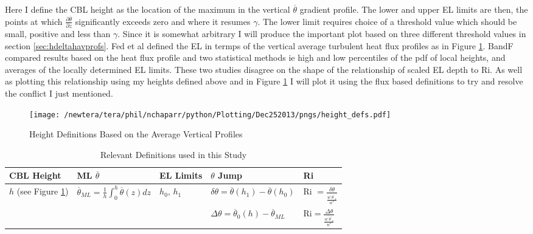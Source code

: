 Here I define the \acs{CBL} height as the location of the maximum in the vertical $\overline{\theta}$ gradient profile.  The lower and upper \acs{EL} limits are then, the points at which $\frac{\partial \overline{\theta}}{\partial z}$ significantly exceeds zero and where it resumes $\gamma$.  The lower limit requires choice of a threshold value which should be small, positive and less than $\gamma$. Since it is somewhat arbitrary I will produce the important plot based on three different threshold values in section \ref{sec:hdeltahavprofs}.  Fed et al defined the \acs{EL} in termps of the vertical average turbulent heat flux profiles as in Figure \ref{fig:hdefs}.  BandF compared results based on the heat flux profile and two statistical methods ie high and low percentiles of the pdf of local heights, and averages of the locally determined \acs{EL} limits. These two studies disagree on the shape of the relationship of scaled \acs{EL} depth to \acs{Ri}.  As well as plotting this relationship using my heights defined above and in Figure \ref{fig:hdefs} I will plot it using the flux based definitions to try and resolve the conflict I just mentioned.\\  

\begin{figure}[htbp]
    \centering
    \texttt{[image: /newtera/tera/phil/nchaparr/python/Plotting/Dec252013/pngs/height\_defs.pdf]}
    \caption{Height Definitions Based on the Average Vertical Profiles }
    \label{fig:hdefs}   %
\end{figure}

\begin{table}[htbp]
    \begin{center}
    \begin{tabular}{ p{2cm} p{2cm}  p{2cm}  p{2cm} p{2cm} }
      \acs{CBL} Height & \acs{ML} $\overline{\theta}$ & \acs{EL} Limits & $\theta$ Jump & \acs{Ri} \\ \hline 
       $h$ (see Figure \ref{fig:hdefs})& $\overline{\theta}_{ML} = \frac{1}{h}\int^{h}_{0}\overline{\theta}(z)dz$ & $h_{0}$, $h_{1}$ & $\delta \theta=\overline{\theta}(h_{1})-\overline{\theta}(h_{0})$ & \acs{Ri} $=\frac{\delta \theta}{\frac{\overline{w^{'}\theta^{'}}_{s}}{w^{*}}}$  \\ %
       & & &$\Delta \theta = \overline{\theta}_{0}(h)- \overline{\theta}_{ML}$ & \acs{Ri}$=\frac{\Delta \theta}{\frac{\overline{w^{'}\theta^{'}}_{s}}{w^{*}}}$ \\ \hline
      \end{tabular}
\caption{Relevant Definitions used in this Study}
\label{table:reldefs}   
\end{center}    
\end{table}

